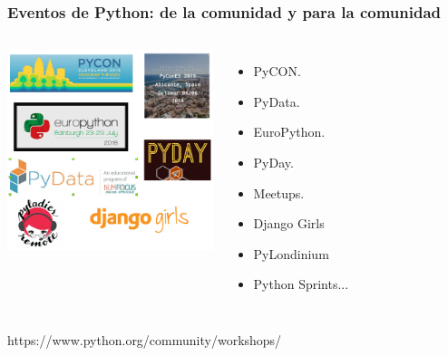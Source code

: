 \documentclass[18pt]{beamer}
\begin{document}
\begin{frame}

	\frametitle{Eventos de Python: de la comunidad y para la comunidad}
	\begin{columns}
		\centering
			\includegraphics[width=6cm]{images/events.png}\\
			
		\begin{itemize}
			\setlength\itemsep{0.6em}		
			\item PyCON.
			\item PyData.
			\item EuroPython.
			\item PyDay.
			\item Meetups.
			\item Django Girls
			\item PyLondinium
			\item Python Sprints...

		\end{itemize}
	\end{columns}
	
	\vspace{0.4cm}
	\centerline{\large https://www.python.org/community/workshops/}
	
\end{frame}
\end{document}
